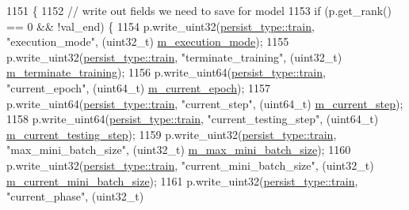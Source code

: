 \begin{DoxyCode}
1151                                                               \{
1152   \textcolor{comment}{// write out fields we need to save for model}
1153   \textcolor{keywordflow}{if} (p.get\_rank() == 0 && !val\_end) \{
1154     p.write\_uint32(\hyperlink{namespacelbann_adee41f31f15f3906cbdcce4a1417eb56a61b3a8faa9c1091806675c230a9abe64}{persist\_type::train}, \textcolor{stringliteral}{"execution\_mode"},     (uint32\_t) 
      \hyperlink{classlbann_1_1model_a2166e2aad256a335ace3bdcae5da2614}{m\_execution\_mode});
1155     p.write\_uint32(\hyperlink{namespacelbann_adee41f31f15f3906cbdcce4a1417eb56a61b3a8faa9c1091806675c230a9abe64}{persist\_type::train}, \textcolor{stringliteral}{"terminate\_training"}, (uint32\_t) 
      \hyperlink{classlbann_1_1model_a639f9c3fcb81b905085f8b1932f8920f}{m\_terminate\_training});
1156     p.write\_uint64(\hyperlink{namespacelbann_adee41f31f15f3906cbdcce4a1417eb56a61b3a8faa9c1091806675c230a9abe64}{persist\_type::train}, \textcolor{stringliteral}{"current\_epoch"},      (uint64\_t) 
      \hyperlink{classlbann_1_1model_a305fac94b9063e59198c7f936923221a}{m\_current\_epoch});
1157     p.write\_uint64(\hyperlink{namespacelbann_adee41f31f15f3906cbdcce4a1417eb56a61b3a8faa9c1091806675c230a9abe64}{persist\_type::train}, \textcolor{stringliteral}{"current\_step"},       (uint64\_t) 
      \hyperlink{classlbann_1_1model_af31a76afc53061747d2170a65e98f692}{m\_current\_step});
1158     p.write\_uint64(\hyperlink{namespacelbann_adee41f31f15f3906cbdcce4a1417eb56a61b3a8faa9c1091806675c230a9abe64}{persist\_type::train}, \textcolor{stringliteral}{"current\_testing\_step"},       (uint64\_t) 
      \hyperlink{classlbann_1_1model_a2acf043862ba878cb7a91cb0d26c3791}{m\_current\_testing\_step});
1159     p.write\_uint32(\hyperlink{namespacelbann_adee41f31f15f3906cbdcce4a1417eb56a61b3a8faa9c1091806675c230a9abe64}{persist\_type::train}, \textcolor{stringliteral}{"max\_mini\_batch\_size"},      (uint32\_t) 
      \hyperlink{classlbann_1_1model_acc496503e7cf8d635e5a31ba09b3c81a}{m\_max\_mini\_batch\_size});
1160     p.write\_uint32(\hyperlink{namespacelbann_adee41f31f15f3906cbdcce4a1417eb56a61b3a8faa9c1091806675c230a9abe64}{persist\_type::train}, \textcolor{stringliteral}{"current\_mini\_batch\_size"},      (uint32\_t) 
      \hyperlink{classlbann_1_1model_a982cea92d230bab5a47df504f02daf98}{m\_current\_mini\_batch\_size});
1161     p.write\_uint32(\hyperlink{namespacelbann_adee41f31f15f3906cbdcce4a1417eb56a61b3a8faa9c1091806675c230a9abe64}{persist\_type::train}, \textcolor{stringliteral}{"current\_phase"},      (uint32\_t) 

\end{DoxyCode}
